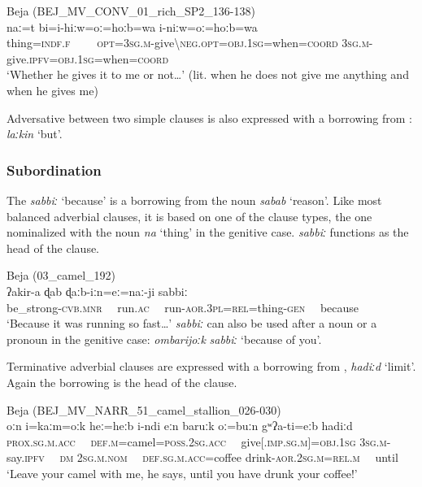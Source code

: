 \documentclass[output=paper]{langsci/langscibook}
\begin{document}
\ea\label{thing}
{{Beja (}BEJ\_MV\_CONV\_01\_rich\_SP2\_136-138)}\\
\gll naː=t bi=i-hiːw=oː=hoːb=wa i-niːw=oː=hoːb=wa\\
     thing=\textsc{indf.f}~~~~ \textsc{opt=3sg.m-}give\textsc{\textbackslash neg.opt=obj.1sg}=when=\textsc{coord} \textsc{3sg.m-}give.\textsc{ipfv=obj.1sg}=when=\textsc{coord}\\
\glt `Whether he gives it to me or not…' (lit. when he does not give me anything and when he gives me)
\z

Adversative  between two simple clauses is also expressed with a borrowing from : \textit{laːkin} ‘but’.


 \subsubsection{Subordination}

The  \textit{sabbiː} ‘because’ is a borrowing from the  noun \textit{sabab} ‘reason’. Like most balanced adverbial clauses, it is based on one of the  clause types, the one nominalized with the noun \textit{na} ‘thing’ in the genitive case. \textit{sabbiː} functions as the head of the  clause.

\ea
{Beja ({03\_camel\_192)}}\\
\gll ʔakir-a ɖab ɖaːb-iːn=eː=naː-ji sabbiː\\
     be\_strong-\textsc{cvb.mnr}~~ run.\textsc{ac}~~ run-\textsc{aor.3pl=rel}=thing-\textsc{gen}~~ because\\
\glt `Because it was running so fast…'
\z
\textit{sabbiː} can also be used after a noun or a pronoun in the genitive case: \textit{ombarijoːk} \textit{sabbiː} ‘because of you’.

Terminative adverbial clauses are expressed with a borrowing from , \textit{hadiːd} ‘limit’. Again the borrowing is the head of the  clause.

\ea\label{ex:vanhove:}
{Beja (BEJ\_MV\_NARR\_51\_camel\_stallion\_026-030)}\\
\gll oːn i=kaːm=oːk heː=heːb i-ndi eːn baruːk oː=buːn gʷʔa-ti=eːb hadiːd\\
     \textsc{prox.sg.m.acc}~~ \textsc{def.m}=camel=\textsc{poss.2sg.acc}~~ give[.\textsc{imp.sg.m]=obj.1sg} \textsc{3sg.m}{}-say.\textsc{ipfv}~~ \textsc{dm} \textsc{2sg.m.nom}~~ \textsc{def.sg.m.acc}=coffee drink-\textsc{aor.2sg.m=rel.m}~~ until\\
\glt `Leave your camel with me, he says, until you have drunk your coffee!'
\z
\end{document}
